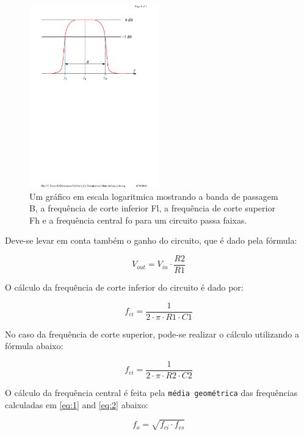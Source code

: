 	\begin{figure}[htb]
		\caption{\label{fig_frequenciacentral}Um gráfico em escala logaritmica mostrando a banda de passagem B, a frequência de corte inferior Fl, a frequência de corte superior Fh e a frequência central fo para um circuito passa faixas.}
		\centering
		\includegraphics[width=0.5\textwidth, trim={4.5cm 17cm 3.3cm 2cm},clip]{freq-corte.pdf}
	\end{figure}
	
	Deve-se levar em conta também o ganho do circuito, que é dado pela fórmula:
	
	\begin{equation}
	V_{out} = V_{in} \cdot \frac{R2}{R1}
	\end{equation}
	
	O cálculo da frequência de corte inferior do circuito é dado por: 
	
	\begin{equation} \label{eq:1}
	f_{ci} = \frac{1}{2 \cdot \pi \cdot R1 \cdot C1}
	\end{equation}
	
	No caso da frequência de corte superior, pode-se realizar o cálculo utilizando a fórmula abaixo:
	
	\begin{equation} \label{eq:2}
	f_{ci} = \frac{1}{2 \cdot \pi \cdot R2 \cdot C2}
	\end{equation}
	
	O cálculo da frequência central é feita pela \texttt{média geométrica} das frequências calculadas em \ref{eq:1} and \ref{eq:2} abaixo: 
	
	\begin{equation} \label{eq:3}
	f_{o} = \sqrt{f_{ci} \cdot f_{cs}}
	\end{equation}
	
